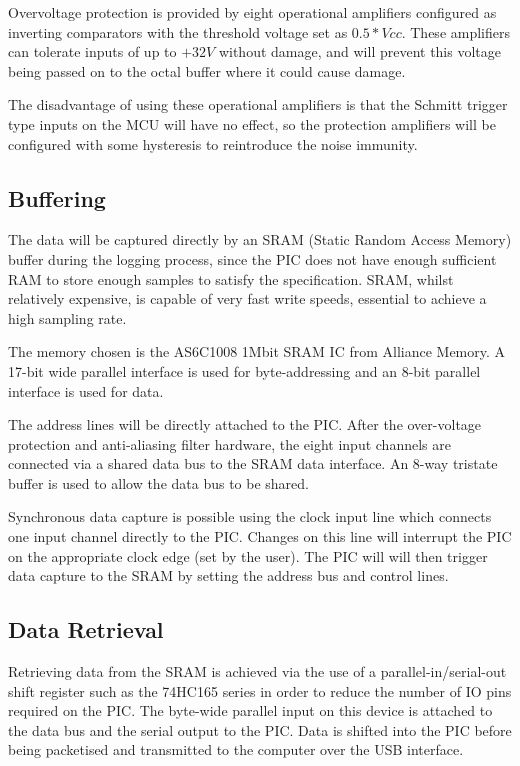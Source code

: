 \documentclass[11pt]{article}
\begin{document}
    Overvoltage protection is provided by eight operational amplifiers
    configured as inverting comparators with the threshold voltage set as
    $0.5*Vcc$. These amplifiers can tolerate inputs of up to $+32V$ without damage, and
    will prevent this voltage being passed on to the octal buffer where it could
    cause damage.

    The disadvantage of using these operational amplifiers is that the Schmitt trigger type inputs on the MCU will have no effect, so the protection amplifiers will be
    configured with some hysteresis to reintroduce the noise immunity.

\subsection{Buffering}
    The data will be captured directly by an SRAM (Static Random Access Memory) buffer during the logging process, since the PIC does not have enough sufficient RAM to store enough samples to satisfy the specification. SRAM, whilst relatively expensive, is capable of very fast write speeds, essential to achieve a high sampling rate.

    The memory chosen is the AS6C1008 1Mbit SRAM IC from Alliance Memory. A 17-bit wide parallel interface is used for byte-addressing and an 8-bit parallel interface is used for data.

    The address lines will be directly attached to the PIC. After the over-voltage protection and anti-aliasing filter hardware, the eight input channels are connected via a shared data bus to the SRAM data interface. An 8-way tristate buffer is used to allow the data bus to be shared.
    
    Synchronous data capture is possible using the clock input line which connects one input channel directly to the PIC. Changes on this line will interrupt the PIC on the appropriate clock edge (set by the user).  The PIC will will then trigger data capture to the SRAM by setting the address bus and control lines.

\subsection{Data Retrieval}
    Retrieving data from the SRAM is achieved via the use of a parallel-in/serial-out shift register such as the 74HC165 series in order to reduce the number of IO pins required on the PIC. The byte-wide parallel input on this device is attached to the data bus and the serial output to the PIC. Data is shifted into the PIC before being packetised and transmitted to the computer over the USB interface.
\end{document}
